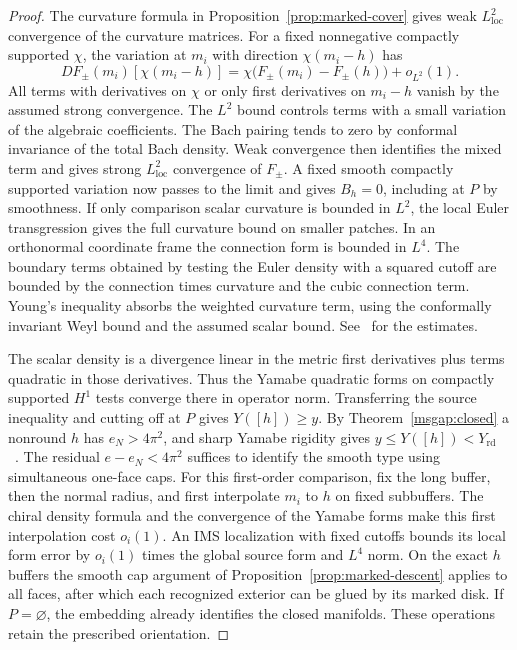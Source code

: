 \documentclass[11pt]{article}
\numberwithin{equation}{section}
\theoremstyle{definition}
\theoremstyle{remark}
\newcommand{\rd}{\mathrm{rd}}
\begin{document}
\begin{proof}
The curvature formula in Proposition~\ref{prop:marked-cover} gives weak
\(L^2_{\mathrm{loc}}\) convergence of the curvature matrices.
For a fixed nonnegative compactly supported \(\chi\), the variation
at \(m_i\) with direction \(\chi(m_i-h)\) has
\[
 DF_\pm(m_i)[\chi(m_i-h)]
 =\chi\bigl(F_\pm(m_i)-F_\pm(h)\bigr)+o_{L^2}(1).
\]
All terms with derivatives on \(\chi\) or only first
derivatives on \(m_i-h\) vanish by the assumed strong convergence.
The \(L^2\) bound controls terms with a small variation of the
algebraic coefficients. The Bach pairing tends to zero by conformal
invariance of the total Bach density. Weak convergence then identifies
the mixed term and gives strong \(L^2_{\mathrm{loc}}\) convergence of
\(F_\pm\). A fixed smooth compactly supported variation now passes
to the limit and gives \(B_h=0\), including at \(P\) by smoothness.
If only comparison scalar curvature is bounded in \(L^2\), the
local Euler transgression gives the full curvature bound on
smaller patches. In an orthonormal coordinate frame the connection
form is bounded in \(L^4\). The boundary terms obtained by testing
the Euler density with a squared cutoff are bounded by the
connection times curvature and the cubic connection term. Young's
inequality absorbs the weighted curvature term, using the
conformally invariant Weyl bound and the assumed scalar bound.
See~\cite{Baker2026MarkedLimits} for the estimates.

The scalar density is a divergence linear in the metric first
derivatives plus terms quadratic in those derivatives. Thus the
Yamabe quadratic forms on compactly supported \(H^1\) tests converge
there in operator norm. Transferring the source inequality and
cutting off at \(P\) gives \(Y([h])\ge y\). By
Theorem~\ref{msgap:closed} a nonround \(h\) has \(e_N>4\pi^2\),
and sharp Yamabe rigidity gives \(y\le Y([h])<Y_{\rd}\)
~\cite[Theorem 2]{Schoen1984Yamabe}. The residual
\(e-e_N<4\pi^2\) suffices to identify the smooth type using simultaneous
one-face caps. For this first-order comparison, fix the long buffer,
then the normal radius, and first interpolate \(m_i\) to \(h\) on
fixed subbuffers. The chiral density formula and the convergence of
the Yamabe forms make this first interpolation cost \(o_i(1)\).
An IMS localization with fixed cutoffs bounds its local form error
by \(o_i(1)\) times the global source form and \(L^4\) norm.
On the exact \(h\) buffers the smooth cap argument of
Proposition~\ref{prop:marked-descent} applies to all faces, after
which each recognized exterior can be glued by its marked disk.
If \(P=\varnothing\), the embedding already identifies the
closed manifolds. These operations retain the prescribed orientation.


\end{proof}
\end{document}
